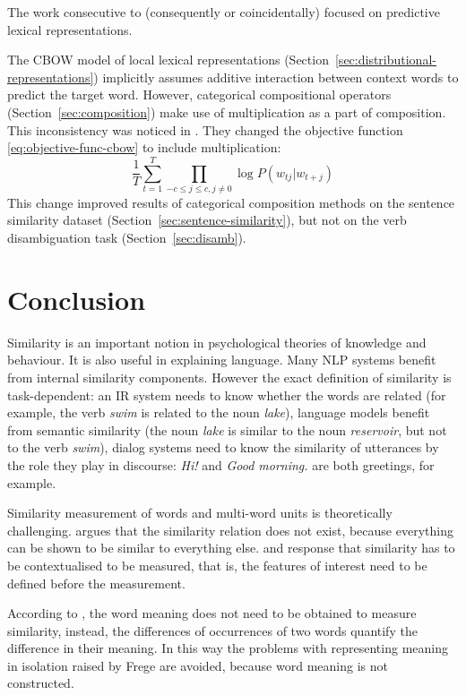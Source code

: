 The work consecutive to \citet{milajevs-EtAl:2014:EMNLP2014} (consequently or coincidentally) focused on predictive lexical representations.

The CBOW model of local lexical representations (Section~\ref{sec:distributional-representations}) implicitly assumes additive interaction between context words to predict the target word. However, categorical compositional operators (Section~\ref{sec:composition}) make use of multiplication as a part of composition. This inconsistency was noticed in \citet{kim2015neural}. They changed the objective function \eqref{eq:objective-func-cbow} to include multiplication:
%
\begin{equation}
 \frac{1}{T}\sum^{T}_{t=1}\prod_{-c \leq j \leq c, j\neq0} \log P(w_{tj}|w_{t+j})
  \label{eq:objective-func-cbow-mult}
\end{equation}
%
This change improved results of categorical composition methods on the sentence similarity dataset (Section~\ref{sec:sentence-similarity}), but not on the verb disambiguation task (Section~\ref{sec:disamb}).
\section{Conclusion}
\label{sec:conclusion-comp}

Similarity is an important notion in psychological theories of knowledge and behaviour. It is also useful in explaining language. Many NLP systems benefit from internal similarity components. However the exact definition of similarity is task-dependent: an IR system needs to know whether the words are related (for example, the verb \textit{swim} is related to the noun \textit{lake}), language models benefit from semantic similarity (the noun \textit{lake} is similar to the noun \textit{reservoir}, but not to the verb \textit{swim}), dialog systems need to know the similarity of utterances by the role they play in  discourse: \textit{Hi!} and \textit{Good morning.} are both greetings, for example.

Similarity measurement of words and multi-word units is theoretically challenging.  argues that the similarity relation does not exist, because everything can be shown to be similar to everything else.  and  response that similarity has to be contextualised to be measured, that is, the features of interest need to be defined before the measurement.

According to , the word meaning does not need to be obtained to measure similarity, instead, the differences of occurrences of two words quantify the difference in their meaning. In this way the problems with representing meaning in isolation raised by Frege are avoided, because word meaning is not constructed.

